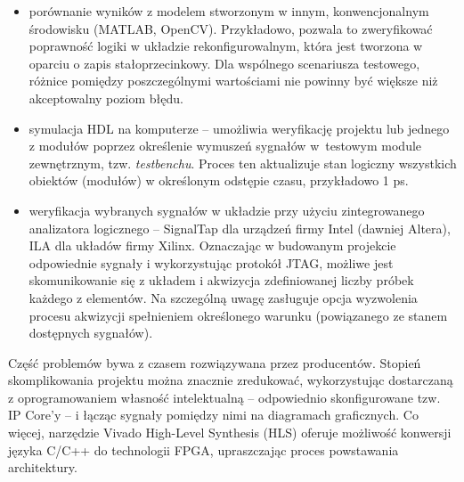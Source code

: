 \begin{itemize}
	\item porównanie wyników z modelem stworzonym w innym, konwencjonalnym środowisku (MATLAB, OpenCV). Przykładowo, pozwala to zweryfikować poprawność logiki w układzie rekonfigurowalnym, która jest tworzona w oparciu o zapis stałoprzecinkowy. Dla wspólnego scenariusza testowego, różnice pomiędzy poszczególnymi wartościami nie powinny być większe niż akceptowalny poziom błędu. %
	\item symulacja HDL na komputerze -- umożliwia weryfikację projektu lub jednego z modułów poprzez określenie wymuszeń sygnałów w~testowym module zewnętrznym, tzw. \textit{testbenchu}. Proces ten aktualizuje stan logiczny wszystkich obiektów (modułów) w określonym odstępie czasu, przykładowo 1 ps.
	\item weryfikacja wybranych sygnałów w układzie przy użyciu zintegrowanego analizatora logicznego --  SignalTap dla urządzeń firmy Intel (dawniej Altera), ILA dla układów firmy Xilinx. Oznaczając w budowanym projekcie odpowiednie sygnały i wykorzystując protokół JTAG, możliwe jest skomunikowanie się z układem i akwizycja zdefiniowanej liczby próbek każdego z elementów. Na szczególną uwagę zasługuje opcja wyzwolenia procesu akwizycji spełnieniem określonego warunku (powiązanego ze stanem dostępnych sygnałów). 
\end{itemize}

Część problemów bywa z czasem rozwiązywana przez producentów. 
Stopień skomplikowania projektu można znacznie zredukować, wykorzystując dostarczaną z oprogramowaniem własność intelektualną -- odpowiednio skonfigurowane tzw. IP Core'y -- i łącząc sygnały pomiędzy nimi na diagramach graficznych. 
Co więcej, narzędzie Vivado High-Level Synthesis (HLS) oferuje możliwość konwersji języka C/C++ do technologii FPGA, upraszczając proces powstawania architektury. 

